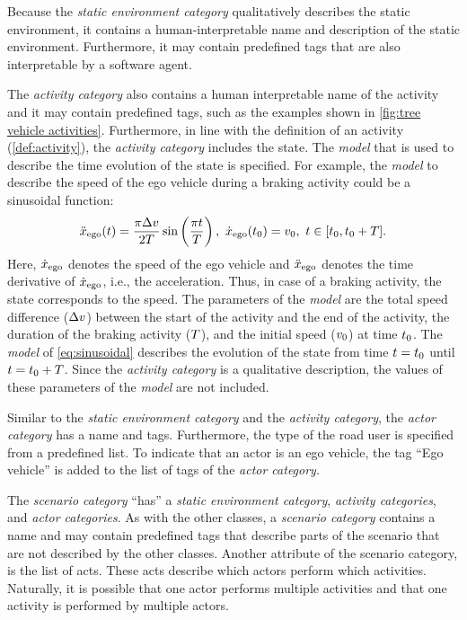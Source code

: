 \cbstartc
Because the \textit{static environment category} qualitatively describes the static environment, it contains a human-interpretable name and description of the static environment. Furthermore, it may contain predefined tags that are also interpretable by a software agent.
\cbend

\cbstart
The \textit{activity category} also contains a human interpretable name of the activity and it may contain predefined tags, such as the examples shown in \cref{fig:tree vehicle activities}. Furthermore, in line with the definition of an activity (\cref{def:activity}), the \textit{activity category} includes the state.
The \textit{model} that is used to describe the time evolution of the state is specified. For example, the \textit{model} to describe the speed of the ego vehicle during a braking activity could be a sinusoidal function:
\cbstartc
\begin{equation} \label{eq:sinusoidal}
	\ddot{x}_{\mathrm{ego}}(t) = \frac{\pi \Delta v}{2T} \sin \left( \frac{\pi t}{T} \right),\ \dot{x}_{\mathrm{ego}}(t_{0}) = v_{0},\ t \in [t_{0}, t_{0}+T].
\end{equation}
Here, $\dot{x}_{\mathrm{ego}}$ denotes the speed of the ego vehicle and $\ddot{x}_{\mathrm{ego}}$ denotes the time derivative of $\dot{x}_{\mathrm{ego}}$, i.e., the acceleration. Thus, in case of a braking activity, the state corresponds to the speed. 
The parameters of the \textit{model} are the total speed difference ($\Delta v$) between the start of the activity and the end of the activity, the duration of the braking activity ($T$), and the initial speed ($v_{0}$) at time $t_{0}$. 
\cbstart
The \textit{model} of \cref{eq:sinusoidal} describes the evolution of the state from time $t=t_{0}$ until $t=t_{0}+T$. Since the \textit{activity category} is a qualitative description, the values of these parameters of the \textit{model} are not included.
\cbend

Similar to the \textit{static environment category} and the \textit{activity category}, the \textit{actor category} has a name and tags. Furthermore, the type of the road user is specified from a predefined list. To indicate that an actor is an ego vehicle, the tag ``Ego vehicle'' is added to the list of tags of the \textit{actor category}.

The \textit{scenario category} ``has'' a \textit{static environment category}, \textit{activity categories}, and \textit{actor categories}. As with the other classes, a \textit{scenario category} contains a name and may contain predefined tags that describe parts of the scenario that are not described by the other classes.
Another attribute of the scenario category, is the list of acts. %
These acts describe which actors perform which activities. Naturally, it is possible that one actor performs multiple activities and that one activity is performed by multiple actors.

